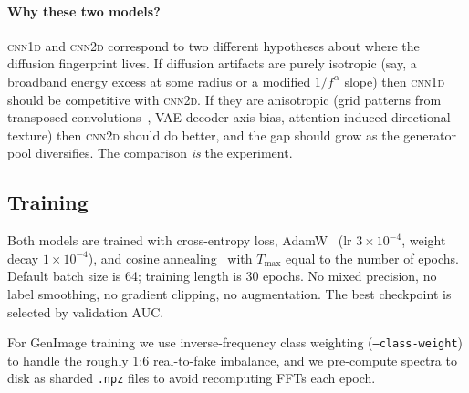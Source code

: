 \paragraph{Why these two models?} \textsc{cnn1d} and \textsc{cnn2d} correspond to two different hypotheses about where the diffusion fingerprint lives. If diffusion artifacts are purely isotropic (say, a broadband energy excess at some radius or a modified $1/f^{\alpha}$ slope) then \textsc{cnn1d} should be competitive with \textsc{cnn2d}. If they are anisotropic (grid patterns from transposed convolutions~\cite{odena2016deconvolution}, VAE decoder axis bias, attention-induced directional texture) then \textsc{cnn2d} should do better, and the gap should grow as the generator pool diversifies. The comparison \emph{is} the experiment.

\subsection{Training}
\label{sec:training}

Both models are trained with cross-entropy loss, AdamW~\cite{loshchilov2019adamw} (lr $3{\times}10^{-4}$, weight decay $1{\times}10^{-4}$), and cosine annealing~\cite{loshchilov2017sgdr} with $T_{\max}$ equal to the number of epochs. Default batch size is 64; training length is 30 epochs. No mixed precision, no label smoothing, no gradient clipping, no augmentation. The best checkpoint is selected by validation AUC.

For GenImage training we use inverse-frequency class weighting (\texttt{--class-weight}) to handle the roughly 1:6 real-to-fake imbalance, and we pre-compute spectra to disk as sharded \texttt{.npz} files to avoid recomputing FFTs each epoch.

